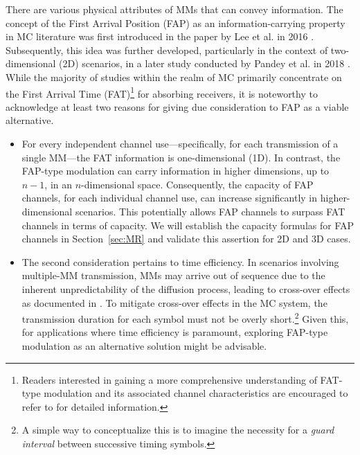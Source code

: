 \documentclass[conference]{IEEEtran}
\theoremstyle{definition}
\theoremstyle{plain}
\begin{document}
There are various physical attributes of MMs that
can convey information.
The concept of the First Arrival Position (FAP) as an information-carrying property in MC literature was first introduced in the paper by Lee et al. in 2016 \cite{lee2016distribution}. Subsequently, this idea was further developed, particularly in the context of two-dimensional (2D) scenarios, in a later study conducted by Pandey et al. in 2018 \cite{pandey2018molecular}.
\color{black}
While the majority of studies within the realm of MC primarily concentrate on the First Arrival Time (FAT)\footnote{Readers interested in gaining a more comprehensive understanding of FAT-type modulation and its associated channel characteristics are encouraged to refer to \cite{srinivas2012molecular,li2014capacity} for detailed information.}
for absorbing receivers, it is noteworthy to acknowledge at least two reasons for giving due consideration to FAP as a viable alternative.
\begin{itemize}
    \item[1)] For every independent channel use—specifically, for each transmission of a single MM—the FAT information is one-dimensional (1D). In contrast, the FAP-type modulation can carry information in higher dimensions, up to \(n-1\), in an \(n\)-dimensional space. Consequently, the capacity of FAP channels, for each individual channel use, can increase significantly in higher-dimensional scenarios. This potentially allows FAP channels to surpass FAT channels in terms of capacity. We will establish the capacity formulas for FAP channels in Section~\ref{sec:MR} and validate this assertion for 2D and 3D cases.
    \item[2)] The second consideration pertains to time efficiency. In scenarios involving multiple-MM transmission, MMs may arrive out of sequence due to the inherent unpredictability of the diffusion process, leading to cross-over effects as documented in \cite{eckford2008molecular,jamali2019channel}. To mitigate cross-over effects in the MC system, the transmission duration for each symbol must not be overly short.\footnote{A simple way to conceptualize this is to imagine the necessity for a \emph{guard interval} between successive timing symbols.} Given this, for applications where time efficiency is paramount, exploring FAP-type modulation as an alternative solution might be advisable.
\end{itemize}
\end{document}
